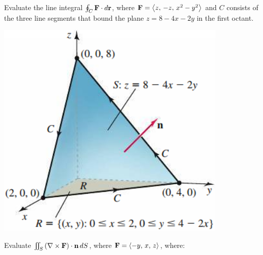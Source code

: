 \documentclass[mathNotesPreamble]{subfiles}
\begin{document}
  \begin{ex*}
    Evaluate the line integral $\oint_C \mathbf F\cdot d{\mathbf{r}}$, where $\mathbf F={\left\langle z,\,-z,\, x^2-y^2 \right\rangle}$ and $C$ consists of the three line segments that bound the plane $z=8-4x-2y$ in the first octant.
  \end{ex*}
  \begin{flushright}
    \includegraphics[width=0.35\linewidth]{images/briggs_17_07/fig17_62}
  \end{flushright}
  \pagebreak

  \begin{ex*}
    Evaluate $\iint_S {\left(\nabla\times\mathbf F\right)}\cdot{\mathbf{n}}\,dS$, where $\mathbf F={\left\langle -y,\,x,\,z \right\rangle}$, where:
  \end{ex*}
\end{document}
